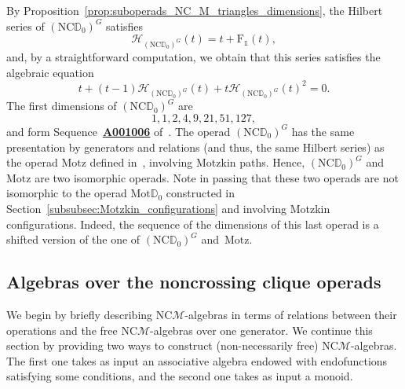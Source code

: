 \documentclass[10pt,reqno]{amsart}
\numberwithin{equation}{subsection}
\newcommand{\Mca}{\mathcal{M}}
\newcommand{\Dbb}{\mathbb{D}}
\newcommand{\NC}{\mathrm{NC}}
\newcommand{\Motzkin}{\mathrm{Mot}}
\newcommand{\Motz}{\mathrm{Motz}}
\newcommand{\Unit}{\mathds{1}}
\newcommand{\Hilbert}{\mathcal{H}}
\newcommand{\SeriesElements}{\mathrm{F}}
\newcommand{\OEIS}[1]{\href{http://oeis.org/#1}{{\bf #1}}}
\begin{document}
\noindent By Proposition~\ref{prop:suboperads_NC_M_triangles_dimensions},
the Hilbert series of $(\NC\Dbb_0)^G$ satisfies
\begin{equation}
    \Hilbert_{(\NC\Dbb_0)^G}(t) = t + \SeriesElements_\Unit(t),
\end{equation}
and, by a straightforward computation, we obtain that this series
satisfies the algebraic equation
\begin{equation}
    t + (t - 1) \Hilbert_{(\NC\Dbb_0)^G}(t)
    + t\Hilbert_{(\NC\Dbb_0)^G}(t)^2 = 0.
\end{equation}
The first dimensions of $(\NC\Dbb_0)^G$ are
\begin{equation}
    1, 1, 2, 4, 9, 21, 51, 127,
\end{equation}
and form Sequence~\OEIS{A001006} of~\cite{Slo}. The operad
$(\NC\Dbb_0)^G$ has the same presentation by generators and relations
(and thus, the same Hilbert series) as the operad $\Motz$ defined
in~\cite{Gir15}, involving Motzkin paths. Hence, $(\NC\Dbb_0)^G$ and
$\Motz$ are two isomorphic operads. Note in passing that these two
operads are not isomorphic to the operad $\Motzkin\Dbb_0$ constructed in
Section~\ref{subsubsec:Motzkin_configurations} and involving Motzkin
configurations. Indeed, the sequence of the dimensions of this last
operad is a shifted version of the one of $(\NC\Dbb_0)^G$ and~$\Motz$.
\medskip

\subsection{Algebras over the noncrossing clique operads}
We begin by briefly describing $\NC\Mca$-algebras in terms of relations
between their operations and the free $\NC\Mca$-algebras over one
generator. We continue this section by providing two ways to construct
(non-necessarily free) $\NC\Mca$-algebras. The first one takes as input
an associative algebra endowed with endofunctions satisfying some
conditions, and the second one takes as input a monoid.
\medskip

\end{document}
